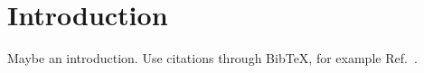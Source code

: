
\chapter{Introduction}

Maybe an introduction.
Use citations through BibTeX, for example Ref.~\cite{STAR:example}.
